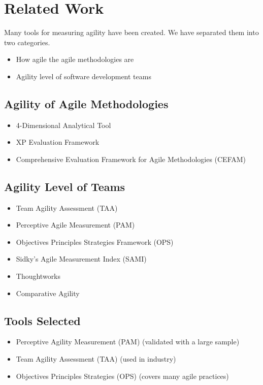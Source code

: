 \section{Related Work}

Many tools for measuring agility have been created. We have separated them into two categories. 

\begin{itemize}
	\item How agile the agile methodologies are
	\item Agility level of software development teams
\end{itemize}

\subsection*{Agility of Agile Methodologies}

\begin{itemize}
	\item 4-Dimensional Analytical Tool
	\item XP Evaluation Framework
	\item Comprehensive Evaluation Framework for Agile Methodologies (CEFAM)
\end{itemize}

\subsection*{Agility Level of Teams}

\begin{itemize}
	\item Team Agility Assessment (TAA)
	\item Perceptive Agile Measurement (PAM)
	\item Objectives Principles Strategies Framework (OPS)
	\item Sidky's Agile Measurement Index (SAMI)
	\item Thoughtworks
	\item Comparative Agility
\end{itemize}

\subsection*{Tools Selected}

\begin{itemize}
	\item Perceptive Agility Measurement (PAM) \cite{pam} ({\footnotesize validated with a large sample})
	\item Team Agility Assessment (TAA) \cite{Leffingwell} ({\footnotesize used in industry})
	\item Objectives Principles Strategies (OPS) \cite{sventha_dissertation} ({\footnotesize covers many agile practices})
\end{itemize}


\clearpage

